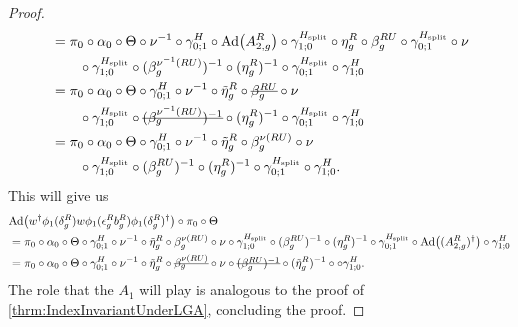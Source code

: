 \documentclass[12pt,a4paper,twoside]{article}
\newcommand{\stkout}[1]{\ifmmode\text{\sout{\ensuremath{#1}}}\else\sout{#1}\fi}
\let\originalleft\left
\let\originalright\right
\renewcommand{\left}{\mathopen{}\mathclose\bgroup\originalleft}
\renewcommand{\right}{\aftergroup\egroup\originalright}
\newcommand{\Ad}[1]{\textrm{Ad}\left(#1\right)}
\theoremstyle{definition}
\numberwithin{equation}{section}
\begin{document}
\begin{proof}
\begin{align}
		&=\pi_0\circ\alpha_0\circ\Theta\circ\nu^{-1}\circ\gamma^H_{0;1}\circ\Ad{A_{2,g}^R}\circ\gamma^{H_{\text{split}}}_{1;0}\circ\eta_g^R\circ\beta_g^{RU}\circ\gamma^{H_\text{split}}_{0;1}\circ\nu\\
		\nonumber
		&\qquad \circ\gamma^{H_\text{split}}_{1;0}\circ(\beta_g^{\nu^{-1}(RU)})^{-1}\circ(\eta_g^R)^{-1}\circ\gamma^{H_{\text{split}}}_{0;1}\circ\gamma^{H}_{1;0}\\
		&=\pi_0\circ\alpha_0\circ\Theta\circ\gamma^H_{0;1}\circ\nu^{-1}\circ\tilde\eta_g^R\circ\stkout{\beta_g^{RU}}\circ\nu\\
		\nonumber
		&\qquad \circ\gamma^{H_\text{split}}_{1;0}\circ\stkout{(\beta_g^{\nu^{-1}(RU)})^{-1}}\circ(\eta_g^R)^{-1}\circ\gamma^{H_{\text{split}}}_{0;1}\circ\gamma^{H}_{1;0}\\
		&=\pi_0\circ\alpha_0\circ\Theta\circ\gamma^H_{0;1}\circ\nu^{-1}\circ\tilde\eta_g^R\circ\beta_g^{\nu(RU)}\circ\nu\\
		\nonumber
		&\qquad \circ\gamma^{H_\text{split}}_{1;0}\circ(\beta_g^{RU})^{-1}\circ(\eta_g^R)^{-1}\circ\gamma^{H_{\text{split}}}_{0;1}\circ\gamma^{H}_{1;0}.
	\end{align}
	This will give us
	\begin{align}
		&\Ad{w^\dagger\phi_1(\delta_g^R)w\phi_1(\epsilon_g^R b_g^R)\phi_1(\delta_g^R)^\dagger}\circ\pi_0\circ\Theta\\
		&=\pi_0\circ\alpha_0\circ\Theta\circ\gamma^H_{0;1}\circ\nu^{-1}\circ\tilde\eta_g^R\circ\beta_g^{\nu(RU)}\circ\nu\circ\gamma^{H_\text{split}}_{1;0}\circ(\beta_g^{RU})^{-1}\circ(\eta_g^R)^{-1}\circ\gamma^{H_{\text{split}}}_{0;1}\circ\Ad{(A_{2,g}^R)^\dagger}\circ\gamma^{H}_{1;0}\\
		&=\pi_0\circ\alpha_0\circ\Theta\circ\gamma^H_{0;1}\circ\nu^{-1}\circ\tilde\eta_g^R\circ\stkout{\beta_g^{\nu(RU)}}\circ\nu\circ\stkout{(\beta_g^{RU})^{-1}}\circ(\tilde\eta_g^R)^{-1}\circ\circ\gamma^{H}_{1;0}.
	\end{align}
	The role that the $A_1$ will play is analogous to the proof of \ref{thrm:IndexInvariantUnderLGA}, concluding the proof.
\end{proof}
\end{document}
